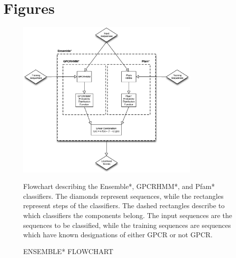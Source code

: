 \section{Figures}


\begin{figure}[H]
  \centering
  \caption{ENSEMBLE* FLOWCHART}
  \includegraphics[width=0.8\textwidth]{figures/gpcr_classifier/ensemble-diagram.eps}
  
Flowchart describing the Ensemble*, GPCRHMM*, and Pfam* classifiers.  The diamonds represent sequences, while the rectangles represent steps of the classifiers.  The dashed rectangles describe to which classifiers the components belong. The input sequences are the sequences to be classified, while the training sequences are sequences which have known designations of either GPCR or not GPCR.
\label{fig:ensemble-diagram}
\end{figure}

